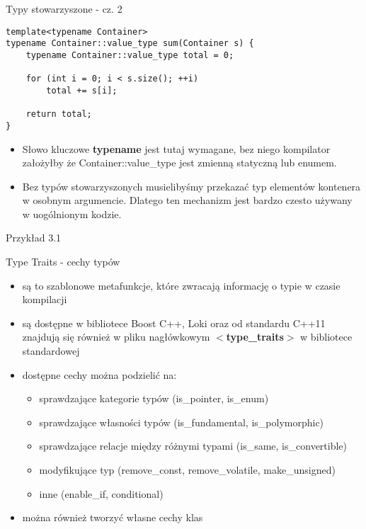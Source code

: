 \documentclass[11pt]{beamer}
\begin{document}
\begin{frame}[fragile]{Typy stowarzyszone - cz. 2}
    \begin{lstlisting}[frame=single,basicstyle=\small]
template<typename Container>
typename Container::value_type sum(Container s) {
    typename Container::value_type total = 0;
    
    for (int i = 0; i < s.size(); ++i)
        total += s[i];

    return total;
}
    \end{lstlisting}
    \begin{itemize}
        \item Słowo kluczowe \textbf{typename} jest tutaj wymagane, bez niego kompilator założyłby że Container::value\_type jest zmienną statyczną lub enumem.
        \item Bez typów stowarzyszonych musielibyśmy przekazać typ elementów kontenera w osobnym argumencie. Dlatego ten mechanizm jest bardzo czesto używany w uogólnionym kodzie.
    \end{itemize}
    \alert{Przykład 3.1} 
\end{frame}

\begin{frame}[fragile]{Type Traits - cechy typów}
    \begin{itemize}
     \item są to szablonowe metafunkcje, które zwracają informację o typie w czasie kompilacji
     \item są dostępne w bibliotece Boost C++, Loki oraz od standardu C++11 znajdują się również w pliku nagłówkowym \textbf{$<$type\_traits$>$} w bibliotece standardowej
     \item dostępne cechy można podzielić na:
      \begin{itemize}
       \item sprawdzające kategorie typów (is\_pointer, is\_enum)
       \item sprawdzające własności typów (is\_fundamental, is\_polymorphic)
       \item sprawdzające relacje między różnymi typami (is\_same, is\_convertible)
       \item modyfikujące typ (remove\_const, remove\_volatile, make\_unsigned)
       \item inne (enable\_if, conditional)
      \end{itemize}
    \item można również tworzyć własne cechy klas
    \end{itemize}
\end{frame}
\end{document}
